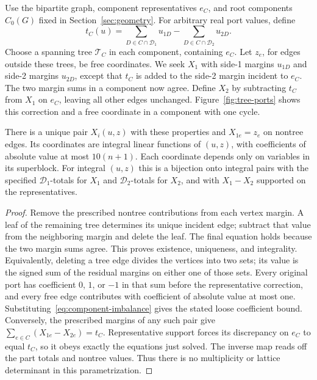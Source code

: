 Use the bipartite graph, component representatives $e_C$, and root
components $C_0(G)$ fixed in Section~\ref{sec:geometry}. For arbitrary
real port values, define
\begin{equation}\label{eq:component-imbalance}
 t_C(u)=\sum_{D\in C\cap\mathcal D_1}u_{1D}
       -\sum_{D\in C\cap\mathcal D_2}u_{2D}.
\end{equation}
Choose a spanning tree $\mathcal T_C$ in each component, containing
$e_C$. Let $z_e$, for edges outside these trees, be free coordinates.
We seek $X_1$ with side-1 margins $u_{1D}$ and side-2 margins $u_{2D}$,
except that $t_C$ is added to the side-2 margin incident to $e_C$.
The two margin sums in a component now agree. Define $X_2$ by
subtracting $t_C$ from $X_1$ on $e_C$, leaving all other edges unchanged.
Figure~\ref{fig:tree-ports} shows this correction and a free coordinate
in a component with one cycle.

\begin{lemma}\label{lem:tree-coordinates}
There is a unique pair $X_i(u,z)$ with these properties and
$X_{1e}=z_e$ on nontree edges. Its coordinates are integral linear
functions of $(u,z)$, with coefficients of absolute value at most
$10(n+1)$. Each coordinate depends only on variables in its superblock.
For integral $(u,z)$ this is a bijection onto integral pairs with the
specified $\mathcal D_1$-totals for $X_1$ and $\mathcal D_2$-totals
for $X_2$, and with $X_1-X_2$ supported on the representatives.
\end{lemma}

\begin{proof}
Remove the prescribed nontree contributions from each vertex margin.
A leaf of the remaining tree determines its unique incident edge;
subtract that value from the neighboring margin and delete the leaf.
The final equation holds because the two margin sums agree. This proves
existence, uniqueness, and integrality. Equivalently, deleting a tree
edge divides the vertices into two sets; its value is the signed sum of
the residual margins on either one of those sets. Every original port
has coefficient $0$, $1$, or $-1$ in that sum before the representative
correction, and every free edge contributes with coefficient of absolute
value at most one. Substituting~\eqref{eq:component-imbalance} gives the
stated loose coefficient bound. Conversely, the prescribed margins of
any such pair give
$\sum_{e\in C}(X_{1e}-X_{2e})=t_C$.
Representative support forces its discrepancy on $e_C$ to equal
$t_C$, so it obeys exactly the equations just solved. The inverse map
reads off the part totals and nontree values. Thus there is no
multiplicity or lattice determinant in this parametrization.
\end{proof}

